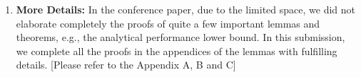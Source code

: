 \documentclass[10pt,draftclsnofoot,onecolumn]{article}
\begin{document}
\begin{enumerate}
\item \textbf{More Details:}
In the conference paper, due to the limited space, we did not elaborate completely the proofs of quite a few important lemmas and theorems, e.g., the analytical performance lower bound.
In this submission, we complete all the proofs in the appendices of the lemmas with fulfilling details. [Please refer to the Appendix A, B and C]



\end{enumerate}
\end{document}

